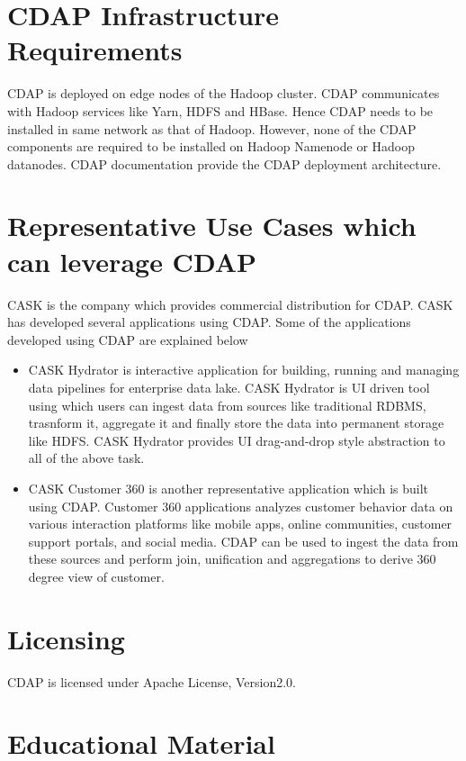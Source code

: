\documentclass[9pt,twocolumn,twoside]{styles/osajnl}
\begin{document}
\section{CDAP Infrastructure Requirements}

CDAP is deployed on edge nodes of the Hadoop cluster. CDAP communicates with
Hadoop services like Yarn, HDFS and HBase. Hence CDAP needs to be installed
in same network as that of Hadoop. However, none of the CDAP components are
required to be installed on Hadoop Namenode or Hadoop datanodes. CDAP
documentation \cite{www-cdap-deployment} provide the CDAP deployment
architecture.

\section{Representative Use Cases which can leverage CDAP}

CASK \cite{www-cask-io} is the company which provides commercial distribution
for CDAP. CASK has developed several applications using CDAP.
Some of the applications developed using CDAP are explained below
\begin{itemize}
\item CASK Hydrator \cite{www-cask-hydrator} is interactive application for
building, running and managing data pipelines for enterprise data lake.
CASK Hydrator is UI driven tool using which users can ingest data from
sources like traditional RDBMS, trasnform it,
aggregate it and finally store the data into permanent storage like HDFS.
CASK Hydrator provides UI drag-and-drop style abstraction to all of the above
 task.
\item CASK Customer 360 \cite{www-cask-customer360} is another representative
 application which is built using CDAP. Customer 360 applications analyzes
 customer behavior data on various interaction platforms like mobile apps,
 online communities, customer support portals, and social media. CDAP can be
 used to ingest the data from these sources and perform join, unification and
  aggregations to derive 360 degree view of customer.
\end{itemize}

\section{Licensing}
CDAP is licensed \cite{www-cdap-license}under Apache License, Version2.0.

\section{Educational Material}
\end{document}

